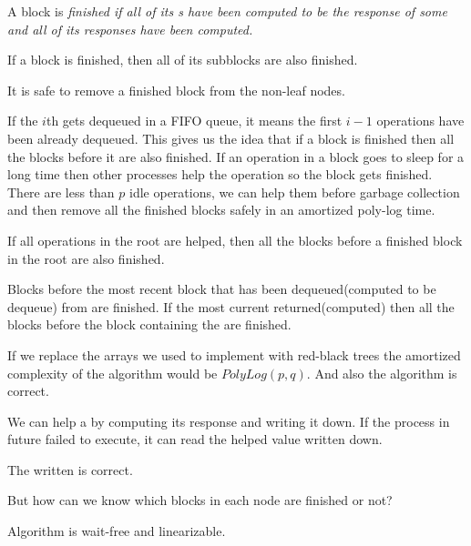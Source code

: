 \begin{definition}
A block  is \it{finished} if all of its s have been computed to be the response of some  and all of its  responses have been computed.  
\end{definition}

\begin{corollary}
If a block is finished, then all of its subblocks are also finished.  
\end{corollary}

\begin{lemma}
It is safe to remove a finished block from the non-leaf nodes.
\end{lemma}

If the $i$th  gets dequeued in a FIFO queue, it means the first $i-1$  operations have been already dequeued. This gives us the idea that if a block is finished then all the blocks before it are also finished. If an operation in a block goes to sleep for a long time then other processes help the operation so the block gets finished. There are less than $p$ idle operations, we can help them before garbage collection and then remove all the finished blocks safely in an amortized poly-log time.

\begin{lemma}
    If all  operations in the root are helped, then all the blocks before a finished block in the root are also finished.
\end{lemma}

\begin{lemma}
  Blocks before the most recent block that has been dequeued(computed to be dequeue) from are finished. If the most current  returned(computed)  then all the blocks before the block containing the  are finished.
\end{lemma}

\begin{lemma}
    If we replace the arrays we used to implement  with red-black trees the amortized complexity of the algorithm would be $PolyLog(p,q)$. And also the algorithm is correct.
\end{lemma}

We can help a  by computing its response and writing it down. If the process in future failed to execute, it can read the helped value written down.

\begin{lemma}
The  written is correct.
\end{lemma}

But how can we know which blocks in each node are finished or not? 


\begin{lemma}
  Algorithm is wait-free and linearizable.
\end{lemma}
